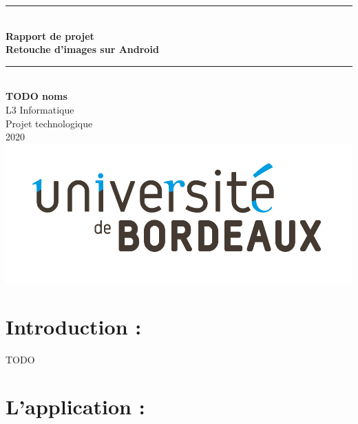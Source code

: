 \documentclass[12pt, a4paper]{article}
\begin{document}
\begin{titlepage}
  \begin{center}

    \rule{\linewidth}{0.5mm} \\[0.4cm]
    { \huge \bfseries {\LARGE{Rapport de projet}}
    \\Retouche d'images sur Android\\[0.4cm] }
    \rule{\linewidth}{0.5mm} \\[1.5cm]
    
    {\LARGE {\textbf{TODO noms}}}\\[0.5cm]
    {\LARGE L3 Informatique}\\[1.5cm]
    
    {\Large Projet technologique}\\[0.5cm]
    {\Large 2020}\\[1.5cm]
    
    \includegraphics[width=1\textwidth]{report_src/logoUB.jpg}
    
    
  \end{center}
\end{titlepage}



\tableofcontents
\clearpage 


\section{Introduction :} \label{intro}
TODO

 
\clearpage

\section{L'application :}
\end{document}
